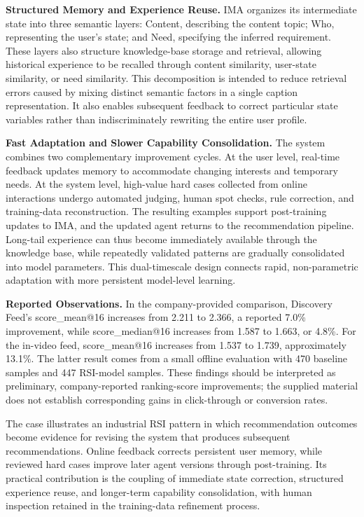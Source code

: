 \textbf{Structured Memory and Experience Reuse.} IMA organizes its intermediate state into three semantic layers: Content, describing the content topic; Who, representing the user’s state; and Need, specifying the inferred requirement. These layers also structure knowledge-base storage and retrieval, allowing historical experience to be recalled through content similarity, user-state similarity, or need similarity. This decomposition is intended to reduce retrieval errors caused by mixing distinct semantic factors in a single caption representation. It also enables subsequent feedback to correct particular state variables rather than indiscriminately rewriting the entire user profile.

\textbf{Fast Adaptation and Slower Capability Consolidation.} The system combines two complementary improvement cycles. At the user level, real-time feedback updates memory to accommodate changing interests and temporary needs. At the system level, high-value hard cases collected from online interactions undergo automated judging, human spot checks, rule correction, and training-data reconstruction. The resulting examples support post-training updates to IMA, and the updated agent returns to the recommendation pipeline. Long-tail experience can thus become immediately available through the knowledge base, while repeatedly validated patterns are gradually consolidated into model parameters. This dual-timescale design connects rapid, non-parametric adaptation with more persistent model-level learning.

\textbf{Reported Observations.} In the company-provided comparison, Discovery Feed’s score\_mean@16 increases from 2.211 to 2.366, a reported 7.0\% improvement, while score\_median@16 increases from 1.587 to 1.663, or 4.8\%. For the in-video feed, score\_mean@16 increases from 1.537 to 1.739, approximately 13.1\%. The latter result comes from a small offline evaluation with 470 baseline samples and 447 RSI-model samples. These findings should be interpreted as preliminary, company-reported ranking-score improvements; the supplied material does not establish corresponding gains in click-through or conversion rates.

The case illustrates an industrial RSI pattern in which recommendation outcomes become evidence for revising the system that produces subsequent recommendations. Online feedback corrects persistent user memory, while reviewed hard cases improve later agent versions through post-training. Its practical contribution is the coupling of immediate state correction, structured experience reuse, and longer-term capability consolidation, with human inspection retained in the training-data refinement process.




